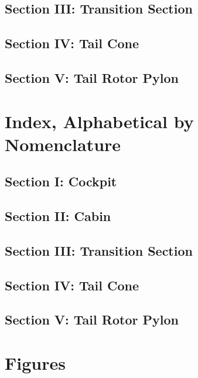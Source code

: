 \documentclass[letterpaper,11pt,openany,oneside]{book}
\begin{document}
\section{Section III: Transition Section}

\clearpage
\section{Section IV: Tail Cone}

\clearpage
\section{Section V: Tail Rotor Pylon}

\clearpage
\chapter{Index, Alphabetical by Nomenclature}
\section{Section I: Cockpit}

\clearpage
\section{Section II: Cabin}

\clearpage
\section{Section III: Transition Section}

\clearpage
\section{Section IV: Tail Cone}

\clearpage
\section{Section V: Tail Rotor Pylon}

\clearpage
\renewcommand{\thefigure}{\arabic{figure}}
\setcounter{figure}{0}
\captionsetup{format=hang,labelformat=default,labelsep=endash}
\chapter{Figures}

\end{document}
